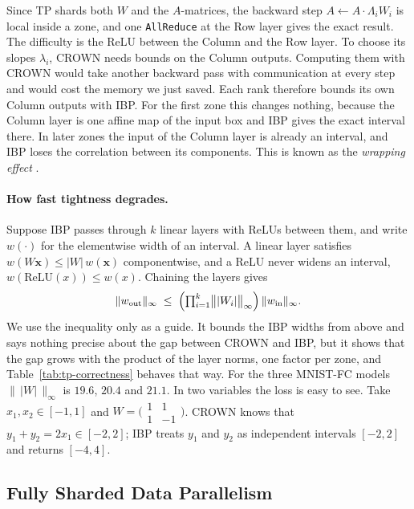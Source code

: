 \documentclass[runningheads]{llncs}
\begin{document}
Since TP shards both $W$ and the $A$-matrices, the backward step
$A \leftarrow A \cdot \Lambda_i W_i$ is local inside a zone, and one
\texttt{AllReduce} at the Row layer gives the exact result. The difficulty is the
ReLU between the Column and the Row layer. To choose its slopes $\lambda_i$,
CROWN needs bounds on the Column outputs. Computing them with CROWN would take
another backward pass with communication at every step and would cost the memory
we just saved. Each rank therefore bounds its own Column outputs with IBP. For
the first zone this changes nothing, because the Column layer is one affine map
of the input box and IBP gives the exact interval there. In later zones the
input of the Column layer is already an interval, and IBP loses the correlation
between its components. This is known as the \emph{wrapping effect}
\cite{moore2009interval}.

\paragraph{How fast tightness degrades.} Suppose IBP passes through $k$
linear layers with ReLUs between them, and write $w(\cdot)$ for the elementwise
width of an interval. A linear layer satisfies
$w(W\mathbf{x}) \leq |W|\,w(\mathbf{x})$ componentwise, and a ReLU never widens
an interval, $w(\mathrm{ReLU}(x)) \leq w(x)$. Chaining the layers gives
\begin{equation}
  \|w_\text{out}\|_\infty \;\leq\;
  \Bigl(\textstyle\prod_{i=1}^{k}\bigl\||W_i|\bigr\|_\infty\Bigr)\,
  \|w_\text{in}\|_\infty .
  \label{eq:wrapping}
\end{equation}
We use the inequality only as a guide. It bounds the IBP widths from above and
says nothing precise about the gap between CROWN and IBP, but it shows that the
gap grows with the product of the layer norms, one factor per zone, and
Table~\ref{tab:tp-correctness} behaves that way. For the three MNIST-FC models
$\|\,|W|\,\|_\infty$ is $19.6$, $20.4$ and $21.1$. In two variables the loss is
easy to see. Take $x_1, x_2 \in [-1,1]$ and
$W = \bigl(\begin{smallmatrix}1&1\\1&-1\end{smallmatrix}\bigr)$. CROWN knows
that $y_1+y_2 = 2x_1 \in [-2,2]$; IBP treats $y_1$ and $y_2$ as independent
intervals $[-2,2]$ and returns $[-4,4]$.

\subsection{Fully Sharded Data Parallelism}
\label{sec:fsdp}
\end{document}
